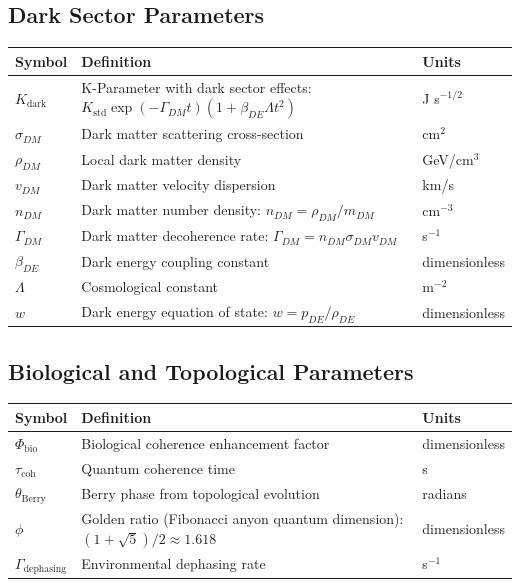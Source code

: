 \documentclass[11pt,a4paper,twoside]{article}
\begin{document}
\subsection*{Dark Sector Parameters}

\begin{longtable}{p{3cm}p{8cm}p{3cm}}
\toprule
\textbf{Symbol} & \textbf{Definition} & \textbf{Units} \\
\midrule
$K_{\text{dark}}$ & K-Parameter with dark sector effects: $K_{\text{std}} \exp(-\Gamma_{DM}t)(1 + \beta_{DE}\Lambda t^2)$ & J s$^{-1/2}$ \\
$\sigma_{DM}$ & Dark matter scattering cross-section & cm$^2$ \\
$\rho_{DM}$ & Local dark matter density & GeV/cm$^3$ \\
$v_{DM}$ & Dark matter velocity dispersion & km/s \\
$n_{DM}$ & Dark matter number density: $n_{DM} = \rho_{DM}/m_{DM}$ & cm$^{-3}$ \\
$\Gamma_{DM}$ & Dark matter decoherence rate: $\Gamma_{DM} = n_{DM} \sigma_{DM} v_{DM}$ & s$^{-1}$ \\
$\beta_{DE}$ & Dark energy coupling constant & dimensionless \\
$\Lambda$ & Cosmological constant & m$^{-2}$ \\
$w$ & Dark energy equation of state: $w = p_{DE}/\rho_{DE}$ & dimensionless \\
\bottomrule
\end{longtable}

\subsection*{Biological and Topological Parameters}

\begin{longtable}{p{3cm}p{8cm}p{3cm}}
\toprule
\textbf{Symbol} & \textbf{Definition} & \textbf{Units} \\
\midrule
$\Phi_{\text{bio}}$ & Biological coherence enhancement factor & dimensionless \\
$\tau_{\text{coh}}$ & Quantum coherence time & s \\
$\theta_{\text{Berry}}$ & Berry phase from topological evolution & radians \\
$\phi$ & Golden ratio (Fibonacci anyon quantum dimension): $(1+\sqrt{5})/2 \approx 1.618$ & dimensionless \\
$\Gamma_{\text{dephasing}}$ & Environmental dephasing rate & s$^{-1}$ \\
\bottomrule
\end{longtable}
\end{document}
